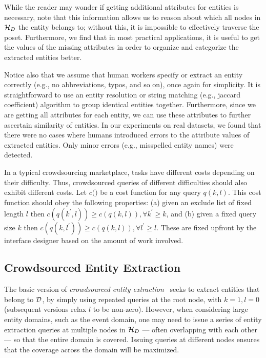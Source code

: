 While the reader may wonder if getting additional attributes for entities is necessary, note that this information allows us to reason about which all nodes in $\mathcal{H}_D$ the entity belongs to; without this, it is impossible to effectively traverse the poset. Furthermore, we find that in most practical applications, it is useful to get the values of the missing attributes in order to organize and categorize the extracted entities better. 

Notice also that we assume that human workers specify or extract an entity correctly (e.g., no abbreviations, typos, and so on), once again for simplicity. It is straightforward to use an entity resolution or string matching (e.g., jaccard coefficient) algorithm to group identical entities together. Furthermore, since we are getting all attributes for each entity, we can use these attributes to further ascertain similarity of entities. In our experiments on real datasets, we found that there were no cases where humans introduced errors to the attribute values of extracted entities. Only minor errors (e.g., misspelled entity names) were detected.

 In a typical crowdsourcing marketplace, tasks have different costs depending on their difficulty. Thus, crowdsourced queries of different difficulties should also exhibit different costs. Let $c(\dot)$ be a cost function for any query $q(k,l)$. This cost function should obey the following properties: (a) given an exclude list of fixed length $l$ then $c(q(k^{\prime},l)) \geq c(q(k,l)),  \forall k^{\prime} \geq k$, and (b) given a fixed query size $k$ then $c(q(k,l^{\prime})) \geq c(q(k,l)), \forall l^{\prime} \geq l$. These are fixed upfront by the interface designer based on the amount of work involved.

\subsection{Crowdsourced Entity Extraction}
\label{sec:extraction}
The basic version of {\em crowdsourced entity extraction}~\cite{trushkowsky:2013} seeks to extract entities that belong to $\mathcal{D}$, by simply using repeated queries at the root node, with $k = 1, l = 0$ (subsequent versions relax $l$ to be non-zero). However, when considering large entity domains, such as the event domain, one may need to issue a series of entity extraction queries at multiple nodes in  $\mathcal{H}_D$ --- often overlapping with each other --- so that the entire domain is covered. Issuing queries at different nodes ensures that the coverage across the domain will be maximized. 

